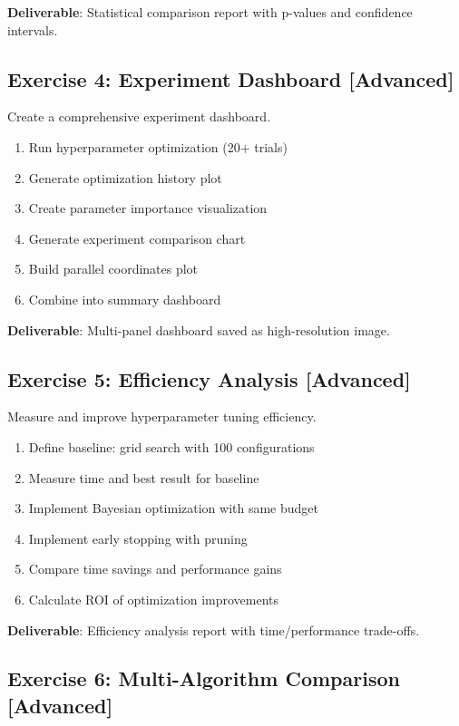 \textbf{Deliverable}: Statistical comparison report with p-values and confidence intervals.

\subsection{Exercise 4: Experiment Dashboard [Advanced]}

Create a comprehensive experiment dashboard.

\begin{enumerate}
    \item Run hyperparameter optimization (20+ trials)
    \item Generate optimization history plot
    \item Create parameter importance visualization
    \item Generate experiment comparison chart
    \item Build parallel coordinates plot
    \item Combine into summary dashboard
\end{enumerate}

\textbf{Deliverable}: Multi-panel dashboard saved as high-resolution image.

\subsection{Exercise 5: Efficiency Analysis [Advanced]}

Measure and improve hyperparameter tuning efficiency.

\begin{enumerate}
    \item Define baseline: grid search with 100 configurations
    \item Measure time and best result for baseline
    \item Implement Bayesian optimization with same budget
    \item Implement early stopping with pruning
    \item Compare time savings and performance gains
    \item Calculate ROI of optimization improvements
\end{enumerate}

\textbf{Deliverable}: Efficiency analysis report with time/performance trade-offs.

\subsection{Exercise 6: Multi-Algorithm Comparison [Advanced]}

